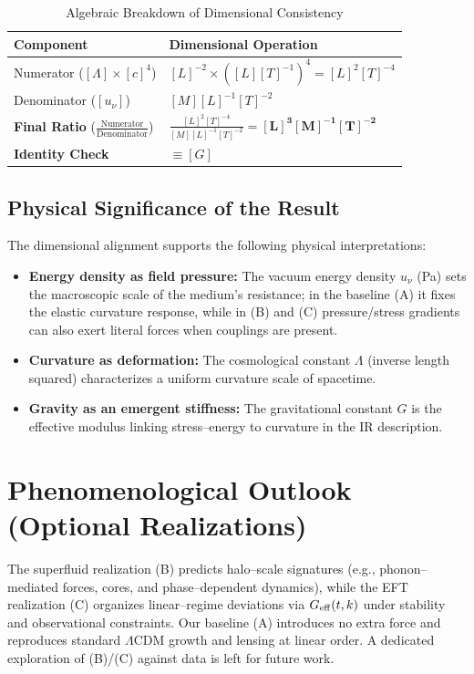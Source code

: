 \documentclass[11pt,a4paper]{article}
\begin{document}
\begin{table}[h]
\centering
\caption{Algebraic Breakdown of Dimensional Consistency}
\label{tab:algebraic_dims}
\vspace{2mm}
\begin{tabular}{@{}ll@{}}
\toprule
\textbf{Component} & \textbf{Dimensional Operation} \\ \midrule
Numerator ($[\Lambda] \times [c]^4$) & $[L]^{-2} \times ([L][T]^{-1})^4 = [L]^2 [T]^{-4}$ \\[3pt]
Denominator ($[u_\nu]$) & $[M] [L]^{-1} [T]^{-2}$ \\[3pt]
\textbf{Final Ratio} ($\frac{\text{Numerator}}{\text{Denominator}}$) & $\frac{[L]^2 [T]^{-4}}{[M] [L]^{-1} [T]^{-2}} = \mathbf{[L]^3 [M]^{-1} [T]^{-2}}$ \\ \midrule
\textbf{Identity Check} & $\equiv [G]$ \\ \bottomrule
\end{tabular}
\end{table}

\subsection*{Physical Significance of the Result}
The dimensional alignment supports the following physical interpretations:
\begin{itemize}
    \item \textbf{Energy density as field pressure:} The vacuum energy density $u_\nu$ (Pa) sets the macroscopic scale of the medium’s resistance; in the baseline (A) it fixes the elastic curvature response, while in (B) and (C) pressure/stress gradients can also exert literal forces when couplings are present.
    \item \textbf{Curvature as deformation:} The cosmological constant $\Lambda$ (inverse length squared) characterizes a uniform curvature scale of spacetime.
    \item \textbf{Gravity as an emergent stiffness:} The gravitational constant $G$ is the effective modulus linking stress--energy to curvature in the IR description.
\end{itemize}

\section{Phenomenological Outlook (Optional Realizations)}
The superfluid realization (B) predicts halo--scale signatures (e.g., phonon--mediated forces, cores, and phase--dependent dynamics), while the EFT realization (C) organizes linear--regime deviations via $G_{\rm eff}(t,k)$ under stability and observational constraints. Our baseline (A) introduces no extra force and reproduces standard $\Lambda$CDM growth and lensing at linear order. A dedicated exploration of (B)/(C) against data is left for future work.
\end{document}
